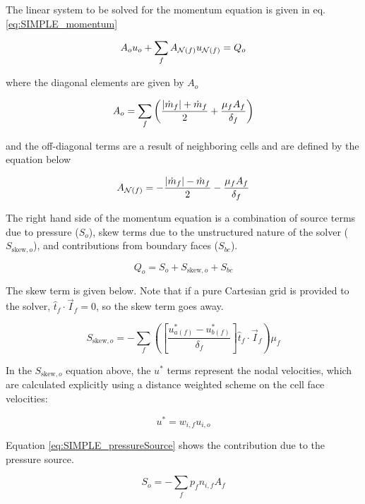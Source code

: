 The linear system to be solved for the momentum equation is given in eq. \ref{eq:SIMPLE_momentum}

\begin{equation}
A_o u_o + \sum_{f} A_{\mathcal{N}(f)} u_{\mathcal{N}(f)} = Q_o \label{eq:SIMPLE_momentum}
\end{equation}

\noindent where the diagonal elements are given by $A_o$

\begin{equation}
A_o = \sum_{f} \left( \frac{|\dot{m}_f| + \dot{m}_f}{2} + \frac{\mu_f A_f}{\delta_f} \right)
\end{equation}

\noindent and the off-diagonal terms are a result of neighboring cells and are defined by the equation below

\begin{equation}
A_{\mathcal{N}(f)} = -\frac{|\dot{m}_f| - \dot{m}_f}{2} - \frac{\mu_f A_f}{\delta_f}
\end{equation}

The right hand side of the momentum equation is a combination of source terms due to pressure ($S_o$), skew terms due to the unstructured nature of the solver ($S_{\text{skew},o}$), and contributions from boundary faces ($S_{bc}$). 

\begin{equation}
Q_o = S_o + S_{\text{skew},o} + S_{bc}
\end{equation}

The skew term is given below. Note that if a pure Cartesian grid is provided to the solver, $\hat{t}_f \cdot \vec{I}_f = 0$, so the skew term goes away.

\begin{equation}
S_{\text{skew},o} = - \sum_{f} \left( \left[ \frac{u_{a(f)}^* - u_{b(f)}^*}{\delta_f} \right] \hat{t}_f \cdot \vec{I}_f \right) \mu_f
\end{equation}

In the $S_{\text{skew},o}$ equation above, the $u^*$ terms represent the nodal velocities, which are calculated explicitly using a distance weighted scheme on the cell face velocities:

\begin{equation}
u^* = w_{i,f}u_{i,o}
\end{equation}

Equation \ref{eq:SIMPLE_pressureSource} shows the contribution due to the pressure source.

\begin{equation}
S_o = - \sum_{f} p_f n_{i,f} A_f \label{eq:SIMPLE_pressureSource}
\end{equation}

